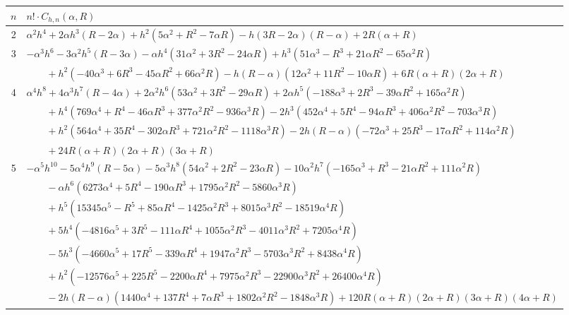 \documentclass[12pt,reqno]{article}
\numberwithin{sfootnote}{section}
\newcommand{\tabletopstrut}[0]{\rule{0pt}{3ex}}
\numberwithin{equation}{section}
\theoremstyle{plain}
\theoremstyle{definition}
\theoremstyle{remark}
\begin{document}
\begin{table}[h]
\begin{subtable}{\textwidth}
\begin{tabular}{|c|l|} 
\hline\tabletopstrut 
$n$ & $n! \cdot C_{h,n}(\alpha, R)$ \\ \hline 
2 & $\alpha ^2 h^4+2 \alpha  h^3 (R-2 \alpha )+h^2 \left(5 \alpha ^2+R^2-7 
     \alpha  R\right)-h (3 R-2 \alpha ) (R-\alpha )+2 R (\alpha +R)$ \\ 
3 & $-\alpha ^3 h^6-3 \alpha ^2 h^5 (R-3 \alpha )-\alpha  h^4 \left(31 
     \alpha ^2+3 R^2-24 \alpha  R\right)+h^3 \left(51 \alpha ^3-R^3+21 
     \alpha  R^2-65 \alpha ^2 R\right)$ \\ 
  & $\qquad + 
     h^2 \left(-40 \alpha ^3+6 R^3-45 
     \alpha  R^2+66 \alpha ^2 R\right)-h (R-\alpha ) \left(12 \alpha ^2+11 
     R^2-10 \alpha R\right)+6 R (\alpha +R) (2 \alpha +R)$ \\ 
4 & $\alpha ^4 h^8+4 \alpha ^3 h^7 (R-4 \alpha )+2 \alpha ^2 h^6 
     \left(53 \alpha ^2+3 R^2-29 \alpha  R\right)+2 \alpha  h^5 
     \left(-188 \alpha ^3+2 R^3-39 \alpha  R^2+165 \alpha ^2 R\right)$ \\ 
  & $\qquad + 
     h^4 \left(769 \alpha ^4+R^4-46 \alpha R^3+377 \alpha ^2 R^2-936 
     \alpha ^3 R\right)-2 h^3 \left(452 \alpha ^4+5 R^4-94 \alpha  R^3+406 
     \alpha ^2 R^2-703 \alpha ^3 R\right)$ \\ 
  & $\qquad + 
     h^2 \left(564 \alpha ^4+35 R^4-302 \alpha R^3+721 \alpha ^2 R^2- 
     1118 \alpha ^3 R\right)-2 h (R-\alpha ) \left(-72 \alpha ^3+25 R^3-17 
     \alpha  R^2+114 \alpha ^2 R\right)$ \\ 
  & $\qquad + 
     24 R (\alpha +R) (2 \alpha +R) (3 \alpha +R)$ \\ 
5 & $-\alpha ^5 h^{10}-5 \alpha ^4 h^9 (R-5 \alpha )-5 \alpha ^3 h^8 
     \left(54 \alpha ^2+2 R^2-23 \alpha  R\right)-10 \alpha ^2 h^7 
     \left(-165 \alpha ^3+R^3-21 \alpha  R^2+111 \alpha ^2 R\right)$ \\ 
  & $\qquad - 
     \alpha  h^6 \left(6273 \alpha ^4+5 R^4-190 \alpha  R^3+1795 
     \alpha ^2 R^2-5860 \alpha ^3 R\right)$ \\ 
  & $\qquad + 
     h^5 \left(15345 \alpha ^5-R^5+85 \alpha  R^4-1425 \alpha ^2 R^3+ 
     8015 \alpha ^3 R^2-18519 \alpha ^4 R\right)$ \\ 
  & $\qquad + 
     5 h^4 \left(-4816 \alpha ^5+3 R^5-111 \alpha  R^4+1055 \alpha ^2 R^3- 
     4011 \alpha ^3 R^2+7205 \alpha ^4 R\right)$ \\ 
  & $\qquad - 
     5 h^3 \left(-4660 \alpha ^5+17 R^5-339 \alpha  R^4+1947 \alpha ^2 R^3- 
     5703 \alpha ^3 R^2+8438 \alpha ^4 R\right)$ \\ 
  & $\qquad + 
     h^2 \left(-12576 \alpha ^5+225 R^5-2200 \alpha  R^4+ 
     7975 \alpha ^2 R^3-22900 \alpha ^3 R^2+26400 \alpha ^4 R\right)$ \\ 
  & $\qquad - 
     2 h (R-\alpha ) \left(1440 \alpha ^4+137 R^4+7 \alpha  R^3+1802 \alpha ^2 R^2-1848 \alpha ^3 R\right)+120 R (\alpha +R) (2 \alpha +R) (3 \alpha +R) (4 \alpha +R)$ \\ \hline 
\hline 
\end{tabular} 


\end{subtable}
\end{table}
\end{document}
